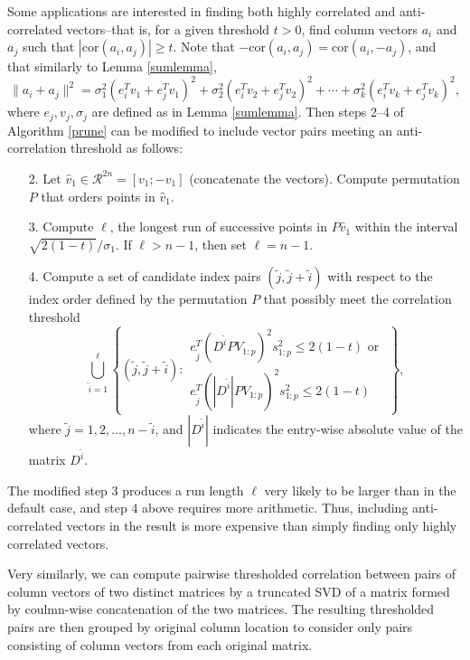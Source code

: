\documentclass{article}
\numberwithin{algorithmctr}{section}
\begin{document}
Some applications are interested in finding both highly correlated and
anti-correlated vectors--that is, for a given threshold $t > 0$, find column
vectors $a_i$ and $a_j$ such that $|\mbox{cor}(a_i, a_j)| \ge t$.
Note that $-\mbox{cor}(a_i, a_j) = \mbox{cor}(a_i, -a_j)$, and that
similarly to Lemma \ref{sumlemma},
\begin{equation*}
\|a_i + a_j\|^2 =
\sigma_1^2 (e_i^Tv_{1} + e_j^Tv_{1})^2 + 
\sigma_2^2 (e_i^Tv_{2} + e_j^Tv_{2})^2 + \cdots + 
\sigma_k^2 (e_i^Tv_{k} + e_j^Tv_{k})^2,
\end{equation*}
where $e_j, v_j, \sigma_j$ are defined as in Lemma \ref{sumlemma}.
Then steps 2--4 of Algorithm \ref{prune} can be modified to include vector pairs meeting an
anti-correlation threshold as follows:
\begin{enumerate}
\item[2.] Let $\hat{v}_1\in\mathcal{R}^{2n}=[v_1; -v_1]$ (concatenate the vectors). Compute permutation
$P$ that orders points in $\hat{v}_1$.
\item[3.] Compute $\ell$, the longest run of successive points in $P \hat{v}_1$ within the interval $\sqrt{2(1-t)}/\sigma_1$. If $\ell > n-1$, then set $\ell = n-1$.
\item[4.] Compute a set of candidate index pairs $(\tilde{j},\tilde{j}+\tilde{i})$ with respect to the index order defined by the permutation $P$ that possibly meet the correlation threshold
\[
\bigcup_{\tilde{i}=1}^\ell
\left\{
(\tilde{j},\tilde{j}+\tilde{i}) :
\begin{array}{l}
e_{\tilde{j}}^T(D^{\tilde{i}} P V_{1:p} )^2 s_{1:p}^2 \le 2(1-t) \mbox{ or }
\\
e_{\tilde{j}}^T(|D^{\tilde{i}}| P V_{1:p} )^2 s_{1:p}^2 \le 2(1-t)
\end{array}
\right\},
\]
where $\tilde{j}=1,2,\ldots,n-\tilde{i}$, and $|D^{\tilde{i}}|$ indicates
the entry-wise absolute value of the matrix $D^{\tilde{i}}$.
\end{enumerate}
The modified step 3 produces a run length $\ell$ very likely to be larger than
in the default case, and step 4 above requires more arithmetic. Thus, including
anti-correlated vectors in the result is more expensive than simply finding
only highly correlated vectors.

Very similarly, we can compute pairwise thresholded correlation between pairs
of column vectors of two distinct matrices by a truncated SVD of a matrix
formed by coulmn-wise concatenation of the two matrices. The resulting
thresholded pairs are then grouped by original column location to consider only
pairs consisting of column vectors from each original matrix.
\end{document}
